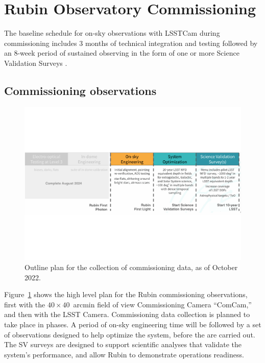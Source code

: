 \section{Rubin Observatory Commissioning}
\label{sec:commissioning}

The baseline schedule for on-sky observations with LSSTCam during commissioning includes 3 months of technical integration and testing followed by an 8-week period of sustained observing in the form of one or more Science Validation Surveys \citep{SCTN-007}.

\subsection{Commissioning observations}

\begin{figure}
\includegraphics[width=\linewidth]{figures/commissioning-plan}
\caption{Outline plan for the collection of commissioning data, as of October 2022.}
\label{fig:commissioning}
\end{figure}

Figure~\ref{fig:commissioning} shows the high level plan for the Rubin commissioning observations, first with the $40\times40$~arcmin field of view Commissioning Camera ``ComCam,'' and then with the LSST Camera.
Commissioning data collection is planned to take place in phases.
A period of on-sky engineering time will be followed by a set of observations designed to help optimize the system, before the \svs are carried out.
The SV surveys are designed to support scientific analyses that validate the system's performance, and allow Rubin to demonstrate operations readiness.

